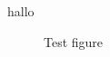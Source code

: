 \documentclass{book}
\begin{document}
hallo 


\begin{figure}
    \caption{Test figure}
\end{figure}
\end{document}
